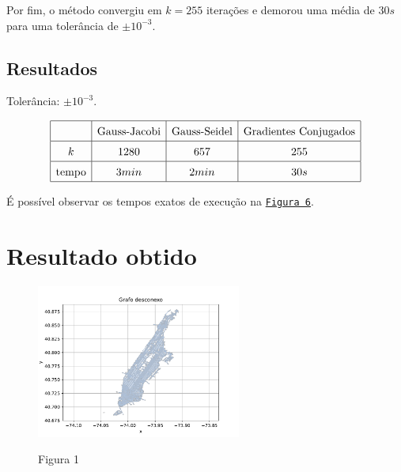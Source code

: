 \documentclass{article}
\begin{document}
    Por fim, o método convergiu em $k = 255$ iterações e demorou uma média de $30s$ para uma tolerância de $\pm 10^{-3}$.

    \hypertarget{3}{}

    \subsection{Resultados}

    Tolerância: $\pm 10^{-3}$.

    \[\renewcommand{\arraystretch}{1.5}
    \begin{array}{|c|c|c|c|}
        \hline
        & \text{Gauss-Jacobi} & \text{Gauss-Seidel} & \text{Gradientes Conjugados}\\
        \hline
        k & 1280 & 657 & 255\\
        \hline
        \text{tempo} & 3min & 2min & 30s\\
        \hline
    \end{array}\]

    É possível observar os tempos exatos de execução na \hyperlink{4}{\texttt{Figura 6}}.

    \section{Resultado obtido}

    \begin{figure}[ht]
        \centering
        \includegraphics[width=0.6\textwidth, trim={0 .3cm 0 .9cm},clip]{../figs/fig1.pdf}
        
        Figura 1
    \end{figure}

    \newpage

    \phantom{}

    \vspace{5cm}
\end{document}
